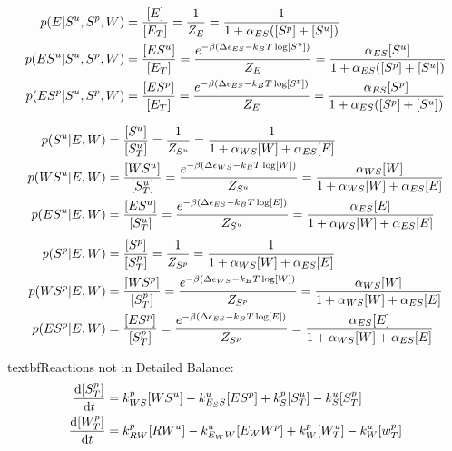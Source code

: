 \documentclass[aps,onecolumn,superscriptaddress,notitlepage]{revtex4-1}
\begin{document}
\begin{align}
p(E|S^u,S^p, W) &= \frac{[E]}{[E_T]} = \frac{1}{Z_E} =  \frac{1}{1 + \alpha_{ES}([S^p]+[S^u])}\\
p(ES^u|S^u,S^p, W) &= \frac{[ES^u]}{[E_T]}  = \frac{e^{-\beta\qty(\Delta\epsilon_{ES} -k_BT \log[S^u])}}{Z_E} =  \frac{\alpha_{ES}[S^u]}{1 + \alpha_{ES}([S^p]+[S^u])}\\
p(ES^p|S^u,S^p, W) &= \frac{[ES^p]}{[E_T]}  = \frac{e^{-\beta\qty(\Delta\epsilon_{ES} -k_BT \log[S^p])}}{Z_E} =  \frac{\alpha_{ES}[S^p]}{1 + \alpha_{ES}([S^p]+[S^u])}
\end{align}

\begin{align}
p(S^u|E, W) &= \frac{[S^u]}{[S^u_T]} = \frac{1}{Z_{S^u}} = \frac{1}{1 + \alpha_{WS}[W]+ \alpha_{ES}[E]}\\
p(WS^u|E, W) &= \frac{[WS^u]}{[S^u_T]} = \frac{ e^{-\beta\qty(\Delta\epsilon_{WS} -k_BT \log[W])}}{Z_{S^u}} = \frac{\alpha_{WS}[W]}{1 + \alpha_{WS}[W]+ \alpha_{ES}[E]}\\
p(ES^u|E, W) &= \frac{[ES^u]}{[S^u_T]} = \frac{ e^{-\beta\qty(\Delta\epsilon_{ES} -k_BT \log[E])}}{Z_{S^u}} = \frac{\alpha_{ES}[E]}{1 + \alpha_{WS}[W]+ \alpha_{ES}[E]}
\end{align}
\begin{align}
p(S^p|E, W) &= \frac{[S^p]}{[S^p_T]} = \frac{1}{Z_{S^p}} = \frac{1}{1 + \alpha_{WS}[W]+ \alpha_{ES}[E]}\\
p(WS^p|E, W) &= \frac{[WS^p]}{[S^p_T]} = \frac{ e^{-\beta\qty(\Delta\epsilon_{WS} -k_BT \log[W])}}{Z_{S^p}} = \frac{\alpha_{WS}[W]}{1 + \alpha_{WS}[W]+ \alpha_{ES}[E]}\\
p(ES^p|E, W) &= \frac{[ES^p]}{[S^p_T]} = \frac{ e^{-\beta\qty(\Delta\epsilon_{ES} -k_BT \log[E])}}{Z_{S^p}} = \frac{\alpha_{ES}[E]}{1 + \alpha_{WS}[W]+ \alpha_{ES}[E]}
\end{align}


textbf{Reactions not in  Detailed Balance:}
\begin{align}
\dv{[S^p_T]}{t} &= k_{WS}^p[WS^u] - k_{E_SS}^u[ES^p] + k_S^p[S^u_T] - k_S^u[S^p_T]\\
\dv{[W^p_T]}{t} &= k_{RW}^p[RW^u] - k_{E_WW}^u[E_WW^p] + k_W^p[W^u_T] - k_W^u[w^p_T]
\end{align}


\end{document}
